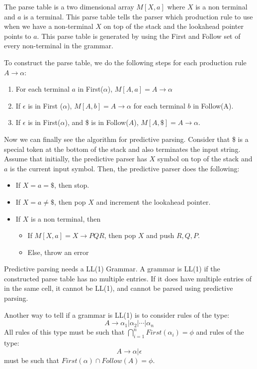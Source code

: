 \documentclass[12pt,letterpaper]{amsbook}
\theoremstyle{definition}
\begin{document}
The parse table is a two dimensional array $M[X,a]$ where $X$ is a non terminal and $a$ is a terminal. This parse table tells the parser which production rule to use when we have a non-terminal $X$ on top of the stack and the lookahead pointer points to $a$. This parse table is generated by using the First and Follow set of every non-terminal in the grammar.

To construct the parse table, we do the following steps for each production rule $A \rightarrow \alpha$:

\begin{enumerate}
  \item For each terminal $a$ in First($\alpha$), $M[A,a] = A \rightarrow \alpha$
  \item If $\epsilon$ is in First ($\alpha$), $M[A,b] = A \rightarrow \alpha$ for each terminal $b$ in Follow(A).
  \item If $\epsilon$ is in First($\alpha$), and \$ is in Follow($A$), $M[A,\$] = A \rightarrow \alpha$.
\end{enumerate}

Now we can finally see the algorithm for predictive parsing. Consider that \$ is a special token at the bottom of the stack and also terminates the input string. Assume that initially, the predictive parser has $X$ symbol on top of the stack and $a$ is the current input symbol. Then, the predictive parser does the following:

\begin{itemize}
  \item If $X=a=\$$, then stop.
  \item If $X = a \neq \$$, then pop $X$ and increment the lookahead pointer.
  \item If $X$ is a non terminal, then
    \begin{itemize}
      \item If $M[X,a] = X \rightarrow PQR$, then pop $X$ and push $R,Q,P$.
      \item Else, throw an error
    \end{itemize}
\end{itemize}

Predictive parsing needs a LL(1) Grammar. A grammar is LL(1) if the constructed parse table has no multiple entries. If it does have multiple entries of in the same cell, it cannot be LL(1), and cannot be parsed using predictive parsing.

Another way to tell if a grammar is LL(1) is to consider rules of the type:
\[A \rightarrow \alpha_1 | \alpha_2 | \cdots | \alpha_n\]
All rules of this type must be such that $\bigcap_{i=1}^n First(\alpha_i) = \phi$ and rules of the type:
\[A \rightarrow \alpha | \epsilon\]
must be such that $First(\alpha) \cap Follow(A) = \phi$.
\end{document}
